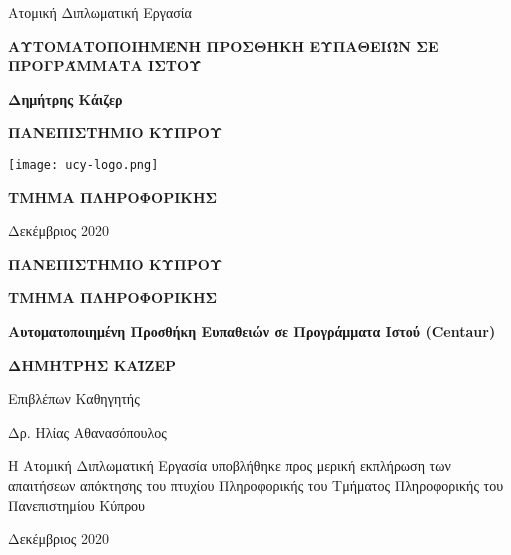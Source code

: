 \documentclass[12pt]{report}
\def\pname{\textlatin{Centaur}\xspace}
\def\ptitle{Αυτοματοποιημένη Προσθήκη Ευπαθειών σε Προγράμματα Ιστού}
\begin{document}
\begin{titlepage}
\begin{center}
\vspace*{1cm}

Ατομική Διπλωματική Εργασία

\vspace*{1cm}

\Large{\textbf{\MakeUppercase{\ptitle{}}}}

\vspace*{1cm}

\large{\textbf{Δημήτρης Κάιζερ}}

\vspace*{1cm}
\Large{\textbf{\MakeUppercase{ΠΑΝΕΠΙΣΤΗΜΙΟ ΚΥΠΡΟΥ}}}

\vspace*{2cm}

\texttt{[image: ucy-logo.png]}

\vspace*{2cm}

\Large{\textbf{\MakeUppercase{ΤΜΗΜΑ ΠΛΗΡΟΦΟΡΙΚΗΣ}}}

\vspace*{4cm}

\normalsize{Δεκέμβριος 2020}
\end{center}
\end{titlepage}

\begin{titlepage}
\begin{center}
\LARGE{\textbf{\MakeUppercase{ΠΑΝΕΠΙΣΤΗΜΙΟ ΚΥΠΡΟΥ}}}

\Large{\textbf{\MakeUppercase{ΤΜΗΜΑ ΠΛΗΡΟΦΟΡΙΚΗΣ}}}

\vspace*{5cm}

\large{\textbf{\ptitle{} (\pname)}}

\vspace*{1cm}

\normalsize{\textbf{ΔΗΜΗΤΡΗΣ ΚΑΪΖΕΡ}}

\vspace*{5cm}

\normalsize{Επιβλέπων Καθηγητής}

\normalsize{Δρ. Hλίας Αθανασόπουλος}

\vspace*{3cm}

\normalsize{Η Ατομική Διπλωματική Εργασία υποβλήθηκε προς μερική εκπλήρωση των απαιτήσεων απόκτησης 
του πτυχίου Πληροφορικής του Τμήματος Πληροφορικής του Πανεπιστημίου Κύπρου}
\vspace*{1cm}

\begin{center}
	Δεκέμβριος 2020
\end{center}

\end{center}

\end{titlepage}
\end{document}
